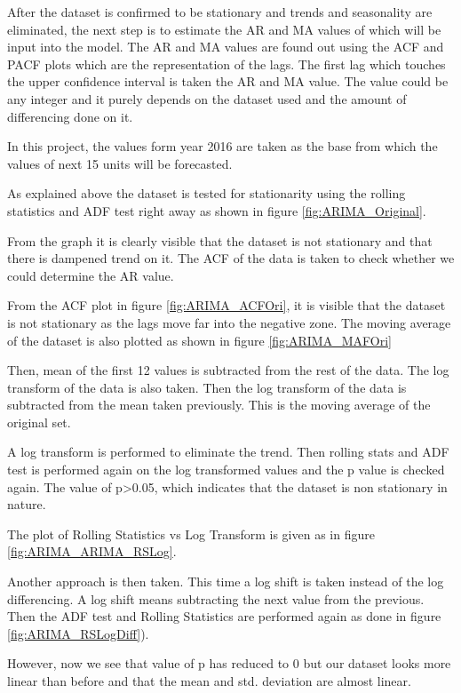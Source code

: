 \documentclass[BTech]{srmuthesis}
\begin{document}
After the dataset is confirmed to be stationary and trends and seasonality are eliminated, the next step is to estimate the AR and MA values of which will be input into the model. The AR and MA values are found out using the ACF and PACF plots which are the representation of the lags. The first lag which touches the upper confidence interval is taken the AR and MA value. The value could be any integer and it purely depends on the dataset used and the amount of differencing done on it.

In this project, the values form year 2016 are taken as the base from which the values of next 15 units will be forecasted. 

As explained above the dataset is tested for stationarity using the rolling statistics and ADF test right away as shown in figure \ref{fig:ARIMA_Original}.

From the graph it is clearly visible that the dataset is not stationary and that there is dampened trend on it. The ACF of the data is taken to check whether we could determine the AR value.

From the ACF plot in figure \ref{fig:ARIMA_ACFOri}, it is visible that the dataset is not stationary as the lags move far into the negative zone. The moving average of the dataset is also plotted as shown in figure \ref{fig:ARIMA_MAFOri}

Then, mean of the first 12 values is subtracted from the rest of the data. The log transform of the data is also taken. Then the log transform of the data is subtracted from the mean taken previously. This is the moving average of the original set.

A log transform is performed to eliminate the trend. Then rolling stats and ADF test is performed again on the log transformed values and the p value is checked again. The value of p>0.05, which indicates that the dataset is non stationary in nature.

The plot of Rolling Statistics vs Log Transform is given as in figure \ref{fig:ARIMA_ARIMA_RSLog}.

Another approach is then taken. This time a log shift is taken instead of the log differencing. A log shift means subtracting the next value from the previous. Then the ADF test and Rolling Statistics are performed again as done in figure \ref{fig:ARIMA_RSLogDiff}).

However, now we see that value of p has reduced to 0 but our dataset looks more linear than before and that the mean and std. deviation are almost linear. 
\end{document}

